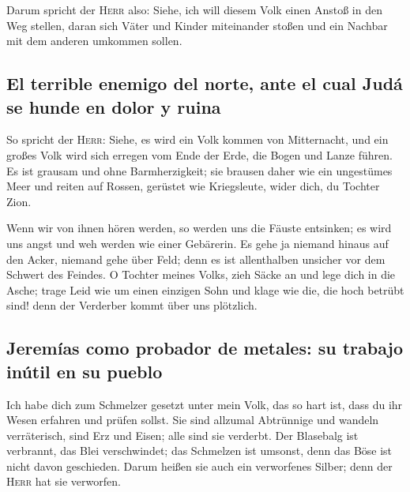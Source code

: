  Darum spricht der \textsc{Herr} also: Siehe, ich will
diesem Volk einen Anstoß in den Weg stellen, daran sich Väter und Kinder
miteinander stoßen und ein Nachbar mit dem anderen umkommen sollen.

\hypertarget{el-terrible-enemigo-del-norte-ante-el-cual-juduxe1-se-hunde-en-dolor-y-ruina}{%
\subsection{El terrible enemigo del norte, ante el cual Judá se hunde en
dolor y
ruina}\label{el-terrible-enemigo-del-norte-ante-el-cual-juduxe1-se-hunde-en-dolor-y-ruina}}

 So spricht der \textsc{Herr}: Siehe, es wird ein Volk
kommen von Mitternacht, und ein großes Volk wird sich erregen vom Ende
der Erde,  die Bogen und Lanze führen. Es ist grausam und
ohne Barmherzigkeit; sie brausen daher wie ein ungestümes Meer und
reiten auf Rossen, gerüstet wie Kriegsleute, wider dich, du Tochter
Zion.

 Wenn wir von ihnen hören werden, so werden uns die
Fäuste entsinken; es wird uns angst und weh werden wie einer Gebärerin.
 Es gehe ja niemand hinaus auf den Acker, niemand gehe
über Feld; denn es ist allenthalben unsicher vor dem Schwert des
Feindes.  O Tochter meines Volks, zieh Säcke an und lege
dich in die Asche; trage Leid wie um einen einzigen Sohn und klage wie
die, die hoch betrübt sind! denn der Verderber kommt über uns plötzlich.

\hypertarget{jeremuxedas-como-probador-de-metales-su-trabajo-inuxfatil-en-su-pueblo}{%
\subsection{Jeremías como probador de metales: su trabajo inútil en su
pueblo}\label{jeremuxedas-como-probador-de-metales-su-trabajo-inuxfatil-en-su-pueblo}}

 Ich habe dich zum Schmelzer gesetzt unter mein Volk, das
so hart ist, dass du ihr Wesen erfahren und prüfen sollst.
 Sie sind allzumal Abtrünnige und wandeln verräterisch,
sind Erz und Eisen; alle sind sie verderbt.  Der
Blasebalg ist verbrannt, das Blei verschwindet; das Schmelzen ist
umsonst, denn das Böse ist nicht davon geschieden.  Darum
heißen sie auch ein verworfenes Silber; denn der \textsc{Herr} hat sie
verworfen.

